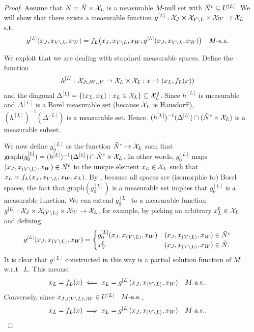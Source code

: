 \begin{proof}
  Assume that $N = \tilde{N} \times \mathcal{X}_L$ is a measurable $M$-null set with $\tilde N^c \subseteq U^{[L]}$.
  We will show that there exists a measurable function $g^{[L]} : \mathcal{X}_{J} \times \mathcal{X}_{V\setminus L} \times \mathcal{X}_{W} \to \mathcal{X}_L$ s.t.\
  $$g^{[L]}(x_{J},x_{V\setminus L},x_{W}) = f_L\big(x_{J}, x_{V\setminus L}, x_W, g^{[L]}(x_{J},x_{V\setminus L},x_{W}) \big) \quad M\text{-a.s.}$$
  
  We exploit that we are dealing with standard measurable spaces.
  Define the function 
  $$h^{[L]} : \mathcal{X}_{J \cup W \cup V} \to \mathcal{X}_L \times \mathcal{X}_L : x \mapsto (x_L, f_L(x))$$
  and the diagonal $\Delta^{[L]} = \{(x_L,x_L) : x_L \in \mathcal{X}_L\} \subseteq \mathcal{X}_L^2$. 
  Since $h^{[L]}$ is measurable and $\Delta^{[L]}$ is a Borel measurable set (because $\mathcal{X}_L$ is Hausdorff), $(h^{[L]})^{-1}(\Delta^{[L]})$ is a measurable set.
  Hence, $(h^{[L]})^{-1}(\Delta^{[L]}) \cap (\tilde N^c \times \mathcal{X}_L)$ is a measurable subset.

  We now define $g^{[L]}_0$ as the function $\tilde N^c \mapsto \mathcal{X}_L$ such that $\mathrm{graph}(g^{[L]}_0) = (h^{[L]})^{-1}(\Delta^{[L]}) \cap \tilde N^c \times \mathcal{X}_L$.
  In other words, $g^{[L]}_0$ maps $(x_J,x_{(V\setminus L)},x_W) \in \tilde{N}^c$ to the unique element $x_L \in \mathcal{X}_L$ such that $x_L = f_L(x_J,x_{V\setminus L},x_W,x_L)$.
  By \cite[14.12]{Kec95}, because all spaces are (isomorphic to) Borel spaces, the fact that $\mathrm{graph}(g^{[L]}_0)$ is a measurable set implies that $g^{[L]}_0$ is a measurable function. 
  We can extend $g_0^{[L]}$ to a measurable function $g^{[L]}: \mathcal{X}_{J} \times \mathcal{X}_{(V\setminus L)} \times \mathcal{X}_{W} \to \mathcal{X}_L$,
  for example, by picking an arbitrary $x_L^0 \in \mathcal{X}_L$ and defining:
  $$g^{[L]}(x_J,x_{(V \setminus L)},x_W) = \begin{cases}
    g^{[L]}_0(x_J,x_{(V \setminus L)},x_W) & (x_J,x_{(V \setminus L)},x_W) \in \tilde{N}^c \\
    x_V^0 & (x_J,x_{(V \setminus L)},x_W) \in \tilde{N}. 
  \end{cases}$$
  It is clear that $g^{[L]}$ constructed in this way is a partial solution function of $M$ w.r.t.\ $L$.
  This means:
    $$x_L = f_L(x) \impliedby x_L = g^{[L]}(x_J,x_{(V\setminus L)},x_W)\quad M\text{-a.s.}.$$
  Conversely, since $x_{J \cup (V\setminus L) \cup W} \in U^{[L]}\quad M\text{-a.s.}$,
    $$x_L = f_L(x) \implies x_L = g^{[L]}(x_J,x_{(V\setminus L)},x_W)\quad M\text{-a.s.}.$$


\end{proof}
